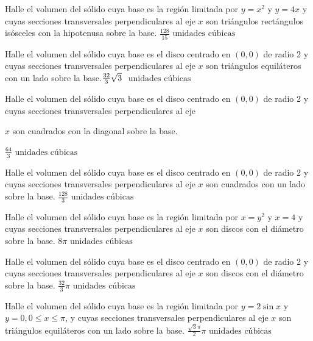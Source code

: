 \begin{ejer}{Halle el volumen del sólido cuya base es la región limitada por $%
	y=x^{2}$ y $y=4x$ y cuyas secciones transversales perpendiculares al eje $x$
	son triángulos rectángulos isósceles con la hipotenusa sobre la
	base.
	 } {$\frac{128}{15} \text{ unidades cúbicas}$}
\end{ejer}


\begin{ejer}{Halle el volumen del sólido cuya base es el disco centrado en $\left(
	0,0\right) $ de radio 2 y cuyas secciones transversales perpendiculares al eje
	$x$ son triángulos equiláteros con un lado sobre la base.}{$\frac{%
		32}{3}\sqrt{3}$ $\text{ unidades cúbicas}$}
\end{ejer}



\begin{ejer}{ Halle el volumen del sólido cuya base es el disco centrado en $\left(
	0,0\right) $ de radio 2 y cuyas secciones transversales perpendiculares al eje

	$x$ son cuadrados con la diagonal sobre la base.}{$\frac{64}{3}\text{ unidades cúbicas}$}
\end{ejer}



\begin{ejer}{Halle el volumen del sólido cuya base es el disco centrado en $\left(
	0,0\right) $ de radio 2 y cuyas secciones transversales perpendiculares al eje
	$x$ son cuadrados con un lado sobre la base.} {$\frac{128}{3}\text{ unidades cúbicas}$}
\end{ejer}



\begin{ejer}{Halle el volumen del sólido cuya base es la región limitada por $%
	x=y^{2}$ y $x=4$ y cuyas secciones transversales perpendiculares al eje $x$
	son discos con el diámetro sobre la base.} {$8\pi \text{ unidades cúbicas}$}
\end{ejer}



\begin{ejer}{Halle el volumen del sólido cuya base es el disco centrado en $\left(
	0,0\right) $ de radio 2 y cuyas secciones transversales perpendiculares al
	eje $x$ son discos con el diámetro sobre la base.} {$\frac{32}{3}\pi
	\text{ unidades cúbicas}$}
\end{ejer}



\begin{ejer}{Halle el volumen del sólido cuya base es la región limitada por $%
	y=2\sin x$ y $y=0,0\leq x\leq \pi $, y cuyas secciones transversales perpendiculares al eje $x$
	son triángulos equiláteros con un lado sobre la base.} {$\frac{\sqrt{3}%
		\pi }{2}\allowbreak \pi \text{ unidades cúbicas}$}
\end{ejer}



